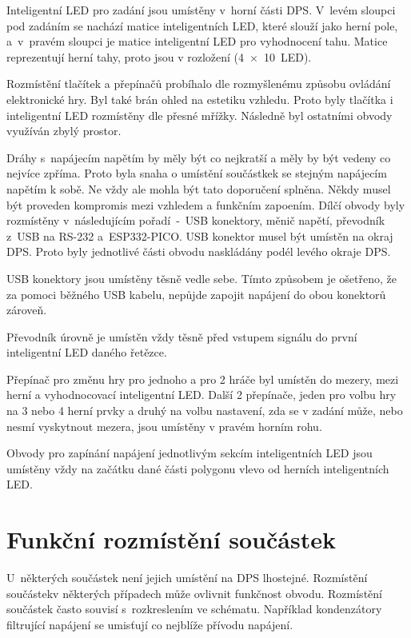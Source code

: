   Inteligentní LED pro zadání jsou umístěny v~horní části DPS. V~levém sloupci pod zadáním se nachází matice inteligentních LED, které slouží jako herní 
  pole, a~v~pravém sloupci je matice inteligentní LED pro vyhodnocení tahu. Matice reprezentují herní tahy, proto jsou v rozložení (4~$\times$~10~LED).
  
  Rozmístění tlačítek a přepínačů probíhalo dle 
  rozmyšlenému způsobu ovládání elektronické hry. Byl také brán ohled na estetiku vzhledu. Proto byly tlačítka i inteligentní LED
  rozmístěny dle přesné mřížky. Následně byl ostatními obvody využíván zbylý prostor. 

  Dráhy s~napájecím napětím by měly být co nejkratší a měly by být vedeny co nejvíce zpříma. Proto byla snaha o umístění součástkek
  se stejným napájecím napětím k sobě. Ne vždy ale mohla být tato doporučení splněna. Někdy musel být proveden kompromis mezi vzhledem a funkčním 
  zapoením. 
  Dílčí obvody byly rozmístěny v~následujícím pořadí~-~USB konektory, měnič napětí, převodník z~USB 
  na RS-232 a~ESP332-PICO. USB konektor musel být umístěn na okraj DPS. Proto byly jednotlivé části obvodu naskládány podél levého okraje DPS.

  USB konektory jsou umístěny těsně vedle sebe. Tímto způsobem je ošetřeno, že za pomoci běžného USB kabelu, nepůjde zapojit napájení do obou 
  konektorů zároveň. 

  Převodník úrovně je umístěn vždy těsně před vstupem signálu do první inteligentní LED daného řetězce.

  Přepínač pro změnu hry pro jednoho a pro 2 hráče byl umístěn do mezery, mezi herní a vyhodnocovací inteligentní LED. Další 2 přepínače, jeden 
  pro volbu hry na 3 nebo 4 herní prvky a druhý na volbu nastavení, zda se v zadání může, nebo nesmí vyskytnout mezera, jsou umístěny v pravém 
  horním rohu. 

  Obvody pro zapínání napájení jednotlivým sekcím inteligentních LED jsou umístěny vždy na začátku dané části polygonu vlevo od herních inteligentních
  LED.

  \section{Funkční rozmístění součástek}
  U~některých součástek není jejich umístění na DPS lhostejné. Rozmístění součástekv některých případech může ovlivnit funkčnost obvodu. 
  Rozmístění součástek často souvisí s~rozkreslením ve schématu. Například kondenzátory filtrující napájení se umisťují co nejblíže přívodu napájení.

